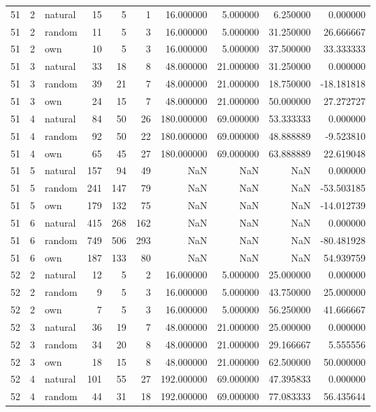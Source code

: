 \begin{table}[htbp]
\begin{tabular}{rrlrrrrrrr}
51 & 2 & natural & 15 & 5 & 1 & 16.000000 & 5.000000 & 6.250000 & 0.000000 \\
51 & 2 & random & 11 & 5 & 3 & 16.000000 & 5.000000 & 31.250000 & 26.666667 \\
51 & 2 & own & 10 & 5 & 3 & 16.000000 & 5.000000 & 37.500000 & 33.333333 \\
51 & 3 & natural & 33 & 18 & 8 & 48.000000 & 21.000000 & 31.250000 & 0.000000 \\
51 & 3 & random & 39 & 21 & 7 & 48.000000 & 21.000000 & 18.750000 & -18.181818 \\
51 & 3 & own & 24 & 15 & 7 & 48.000000 & 21.000000 & 50.000000 & 27.272727 \\
51 & 4 & natural & 84 & 50 & 26 & 180.000000 & 69.000000 & 53.333333 & 0.000000 \\
51 & 4 & random & 92 & 50 & 22 & 180.000000 & 69.000000 & 48.888889 & -9.523810 \\
51 & 4 & own & 65 & 45 & 27 & 180.000000 & 69.000000 & 63.888889 & 22.619048 \\
51 & 5 & natural & 157 & 94 & 49 & NaN & NaN & NaN & 0.000000 \\
51 & 5 & random & 241 & 147 & 79 & NaN & NaN & NaN & -53.503185 \\
51 & 5 & own & 179 & 132 & 75 & NaN & NaN & NaN & -14.012739 \\
51 & 6 & natural & 415 & 268 & 162 & NaN & NaN & NaN & 0.000000 \\
51 & 6 & random & 749 & 506 & 293 & NaN & NaN & NaN & -80.481928 \\
51 & 6 & own & 187 & 133 & 80 & NaN & NaN & NaN & 54.939759 \\
52 & 2 & natural & 12 & 5 & 2 & 16.000000 & 5.000000 & 25.000000 & 0.000000 \\
52 & 2 & random & 9 & 5 & 3 & 16.000000 & 5.000000 & 43.750000 & 25.000000 \\
52 & 2 & own & 7 & 5 & 3 & 16.000000 & 5.000000 & 56.250000 & 41.666667 \\
52 & 3 & natural & 36 & 19 & 7 & 48.000000 & 21.000000 & 25.000000 & 0.000000 \\
52 & 3 & random & 34 & 20 & 8 & 48.000000 & 21.000000 & 29.166667 & 5.555556 \\
52 & 3 & own & 18 & 15 & 8 & 48.000000 & 21.000000 & 62.500000 & 50.000000 \\
52 & 4 & natural & 101 & 55 & 27 & 192.000000 & 69.000000 & 47.395833 & 0.000000 \\
52 & 4 & random & 44 & 31 & 18 & 192.000000 & 69.000000 & 77.083333 & 56.435644 \\

\end{tabular}
\end{table}

